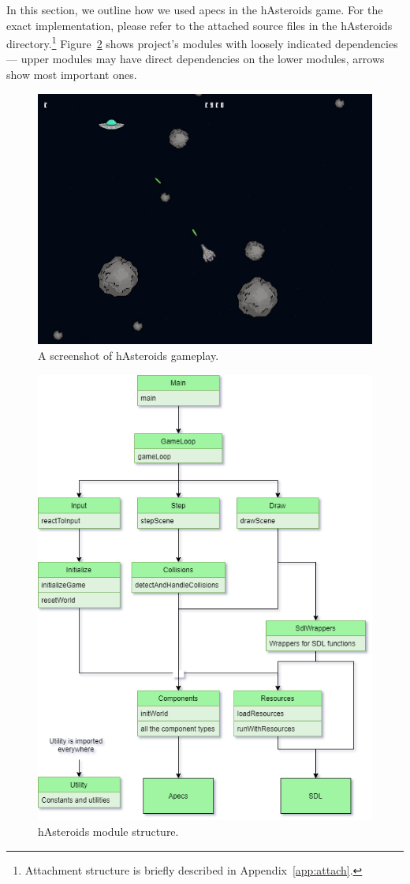\documentclass[
  digital, %
  color,   %
  table,   %
  oneside, %
  lof,     %
  lot,     %
]{fithesis3}
\begin{document}
In this section, we outline how we used apecs in the hAsteroids game.
For the exact implementation, please refer to the attached source files
in the hAsteroids directory.\footnote{
Attachment structure is briefly described in Appendix~\ref{app:attach}.}
Figure~\ref{fig:hasteroidsmodules} shows project's modules with loosely indicated
dependencies --- upper modules may have direct dependencies on the lower modules,
arrows show most important ones.
\begin{figure}[hbt!]
    \centering
    \includegraphics[width=0.7 \textwidth]{images/hasteroids-screenshot.jpg}
    \caption{A screenshot of hAsteroids gameplay.}
    \label{fig:hasteroidsscreenshot}
\end{figure}

\begin{figure}
    \centering
    \includegraphics[width=\textwidth]{images/modules.png}
    \caption{hAsteroids module structure.}
    \label{fig:hasteroidsmodules}
\end{figure}
\end{document}
